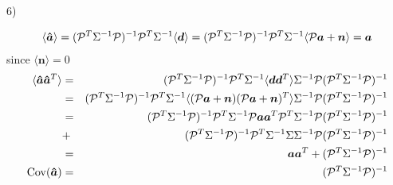 \documentclass[a4paper]{article}
\def\ba{\begin{eqnarray}}
\def\ea{\end{eqnarray}}
\begin{document}
6)

\ba
\langle  \bm{\hat{a}}  \rangle= ( {\cal P}^{T}  \Sigma^{-1}{\cal P})^{-1}{\cal P}^{T}  \Sigma^{-1} \langle \bm{d} \rangle =  ( {\cal P}^{T}  \Sigma^{-1}{\cal P})^{-1}{\cal P}^{T}  \Sigma^{-1} \langle  {\cal P}\bm{a} + \bm{n} \rangle  = \bm{a}
\ea
since $\langle  \bm{n} \rangle=0$
\ba
\langle  \bm{\hat{a}} \bm{\hat{a}}^{T}  \rangle &=& ( {\cal P}^{T}  \Sigma^{-1}{\cal P})^{-1}{\cal P}^{T}  \Sigma^{-1} \langle \bm{d}  \bm{d}^{T} \rangle  \Sigma^{-1}{\cal P} ( {\cal P}^{T}  \Sigma^{-1}{\cal P})^{-1} \nonumber \\
&=&  ( {\cal P}^{T}  \Sigma^{-1}{\cal P})^{-1}{\cal P}^{T}  \Sigma^{-1} \langle  ({\cal P}\bm{a} + \bm{n})({\cal P}\bm{a} + \bm{n})^{T}\rangle  \Sigma^{-1}{\cal P} ( {\cal P}^{T}  \Sigma^{-1}{\cal P})^{-1} \nonumber \\
&=&  ( {\cal P}^{T}  \Sigma^{-1}{\cal P})^{-1}{\cal P}^{T}  \Sigma^{-1}   {\cal P}\bm{a} \bm{a}^{T} {\cal P}^{T}   \Sigma^{-1}{\cal P} ( {\cal P}^{T}  \Sigma^{-1}{\cal P})^{-1} \nonumber \\
&+& ( {\cal P}^{T}  \Sigma^{-1}{\cal P})^{-1}{\cal P}^{T}  \Sigma^{-1} \Sigma  \Sigma^{-1}{\cal P} ( {\cal P}^{T}  \Sigma^{-1}{\cal P})^{-1} \nonumber \\
&=&   \bm{a} \bm{a}^{T}   +  ( {\cal P}^{T}  \Sigma^{-1}{\cal P})^{-1} \nonumber \\
{\rm Cov}(\bm{\hat{a}}) &=&  ( {\cal P}^{T}  \Sigma^{-1}{\cal P})^{-1}
\ea
\end{document}

